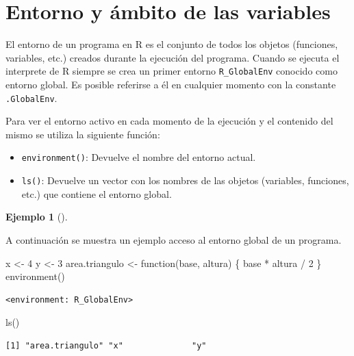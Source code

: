 \documentclass[
  a4paper,
]{scrreport}
\newenvironment{Shaded}{\begin{snugshade}}{\end{snugshade}}
\newcommand{\ControlFlowTok}[1]{\textcolor[rgb]{0.00,0.23,0.31}{#1}}
\newcommand{\DecValTok}[1]{\textcolor[rgb]{0.68,0.00,0.00}{#1}}
\newcommand{\FunctionTok}[1]{\textcolor[rgb]{0.28,0.35,0.67}{#1}}
\newcommand{\NormalTok}[1]{\textcolor[rgb]{0.00,0.23,0.31}{#1}}
\newcommand{\OtherTok}[1]{\textcolor[rgb]{0.00,0.23,0.31}{#1}}
\newcommand{\SpecialCharTok}[1]{\textcolor[rgb]{0.37,0.37,0.37}{#1}}
\providecommand{\tightlist}{%
  \setlength{\itemsep}{0pt}\setlength{\parskip}{0pt}}\usepackage{longtable,booktabs,array}
\theoremstyle{definition}
\newtheorem{example}{Ejemplo}[chapter]
\theoremstyle{definition}
\theoremstyle{remark}
\begin{document}
\hypertarget{entorno-y-uxe1mbito-de-las-variables}{%
\section{Entorno y ámbito de las
variables}\label{entorno-y-uxe1mbito-de-las-variables}}

El entorno de un programa en R es el conjunto de todos los objetos
(funciones, variables, etc.) creados durante la ejecución del programa.
Cuando se ejecuta el interprete de R siempre se crea un primer entorno
\texttt{R\_GlobalEnv} conocido como entorno global. Es posible referirse
a él en cualquier momento con la constante \texttt{.GlobalEnv}.

Para ver el entorno activo en cada momento de la ejecución y el
contenido del mismo se utiliza la siguiente función:

\begin{itemize}
\tightlist
\item
  \texttt{environment()}: Devuelve el nombre del entorno actual.
\item
  \texttt{ls()}: Devuelve un vector con los nombres de las objetos
  (variables, funciones, etc.) que contiene el entorno global.
\end{itemize}

\leavevmode{}%
\begin{example}[]\label{exm-acceso-entorno-global}

A continuación se muestra un ejemplo acceso al entorno global de un
programa.

\begin{Shaded}
\begin{Highlighting}[]
\NormalTok{x }\OtherTok{\textless{}{-}} \DecValTok{4}
\NormalTok{y }\OtherTok{\textless{}{-}} \DecValTok{3}
\NormalTok{area.triangulo }\OtherTok{\textless{}{-}} \ControlFlowTok{function}\NormalTok{(base, altura) \{}
\NormalTok{  base }\SpecialCharTok{*}\NormalTok{ altura }\SpecialCharTok{/} \DecValTok{2}
\NormalTok{\}}
\FunctionTok{environment}\NormalTok{()}
\end{Highlighting}
\end{Shaded}

\begin{verbatim}
<environment: R_GlobalEnv>
\end{verbatim}

\begin{Shaded}
\begin{Highlighting}[]
\FunctionTok{ls}\NormalTok{()}
\end{Highlighting}
\end{Shaded}

\begin{verbatim}
[1] "area.triangulo" "x"              "y"             
\end{verbatim}

\end{example}
\end{document}
